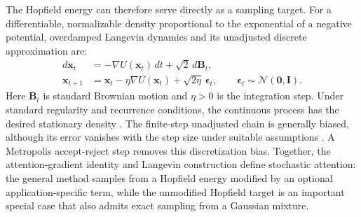 The Hopfield energy can therefore serve directly as a sampling target. For a
differentiable, normalizable density proportional to the exponential of a
negative potential, overdamped Langevin dynamics and its unadjusted discrete
approximation are:
\begin{align}
d\mathbf x_t
&=-\nabla U(\mathbf x_t)\,dt+\sqrt2\,d\mathbf B_t,
\label{eq:langevin-sde}\\
\mathbf x_{t+1}
&=\mathbf x_t-\eta\nabla U(\mathbf x_t)
+\sqrt{2\eta}\,\boldsymbol\epsilon_t,
\qquad
\boldsymbol\epsilon_t\sim\mathcal N(\mathbf0,\mathbf I).
\label{eq:ula}
\end{align}
Here $\mathbf B_t$ is standard Brownian motion and $\eta>0$ is the integration
step. Under standard regularity and recurrence conditions, the continuous
process has the desired stationary density
\cite{robertsTweedieExponentialConvergence1996}. The finite-step unadjusted
chain is generally biased, although its error vanishes with the step size under
suitable assumptions \cite{durmusNonasymptoticAnalysisUnadjusted2017}. A
Metropolis accept-reject step removes this discretization bias. Together, the
attention-gradient identity and Langevin construction define stochastic
attention: the general method samples from a Hopfield energy modified by an
optional application-specific term, while the unmodified Hopfield target is an
important special case that also admits exact sampling from a Gaussian mixture.
